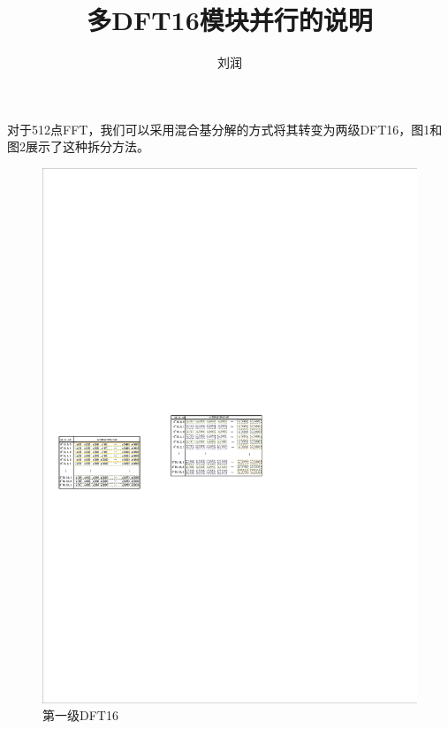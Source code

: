 \documentclass[12pt,a4paper]{article}
\author{刘润}
\begin{document}
\title{多DFT16模块并行的说明}
\maketitle

对于512点FFT，我们可以采用混合基分解的方式将其转变为两级DFT16，图1和图2展示了这种拆分方法。

\begin{figure}[htbp]
\centering
\includegraphics[scale=1.5]{figure/figure1}
\caption{第一级DFT16}
\end{figure}
\end{document}
